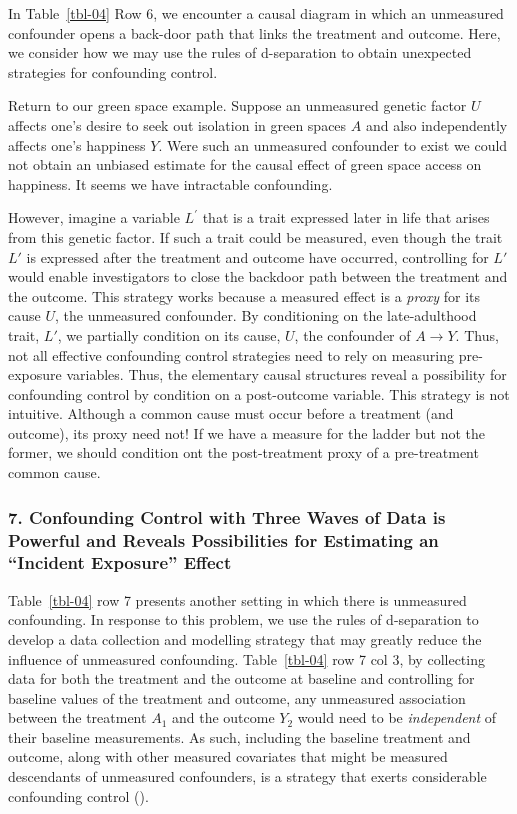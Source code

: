 \documentclass[
  singlecolumn]{article}
\begin{document}
In Table~\ref{tbl-04} Row 6, we encounter a causal diagram in which an
unmeasured confounder opens a back-door path that links the treatment
and outcome. Here, we consider how we may use the rules of d-separation
to obtain unexpected strategies for confounding control.

Return to our green space example. Suppose an unmeasured genetic factor
\(U\) affects one's desire to seek out isolation in green spaces \(A\)
and also independently affects one's happiness \(Y\). Were such an
unmeasured confounder to exist we could not obtain an unbiased estimate
for the causal effect of green space access on happiness. It seems we
have intractable confounding.

However, imagine a variable \(L^\prime\) that is a trait expressed later
in life that arises from this genetic factor. If such a trait could be
measured, even though the trait \(L'\) is expressed after the treatment
and outcome have occurred, controlling for \(L'\) would enable
investigators to close the backdoor path between the treatment and the
outcome. This strategy works because a measured effect is a \emph{proxy}
for its cause \(U\), the unmeasured confounder. By conditioning on the
late-adulthood trait, \(L'\), we partially condition on its cause,
\(U\), the confounder of \(A \to Y\). Thus, not all effective
confounding control strategies need to rely on measuring pre-exposure
variables. Thus, the elementary causal structures reveal a possibility
for confounding control by condition on a post-outcome variable. This
strategy is not intuitive. Although a common cause must occur before a
treatment (and outcome), its proxy need not! If we have a measure for
the ladder but not the former, we should condition ont the
post-treatment proxy of a pre-treatment common cause.

\subsubsection{7. Confounding Control with Three Waves of Data is
Powerful and Reveals Possibilities for Estimating an ``Incident
Exposure''
Effect}\label{confounding-control-with-three-waves-of-data-is-powerful-and-reveals-possibilities-for-estimating-an-incident-exposure-effect}

Table~\ref{tbl-04} row 7 presents another setting in which there is
unmeasured confounding. In response to this problem, we use the rules of
d-separation to develop a data collection and modelling strategy that
may greatly reduce the influence of unmeasured confounding.
Table~\ref{tbl-04} row 7 col 3, by collecting data for both the
treatment and the outcome at baseline and controlling for baseline
values of the treatment and outcome, any unmeasured association between
the treatment \(A_1\) and the outcome \(Y_2\) would need to be
\emph{independent} of their baseline measurements. As such, including
the baseline treatment and outcome, along with other measured covariates
that might be measured descendants of unmeasured confounders, is a
strategy that exerts considerable confounding control
().
\end{document}
